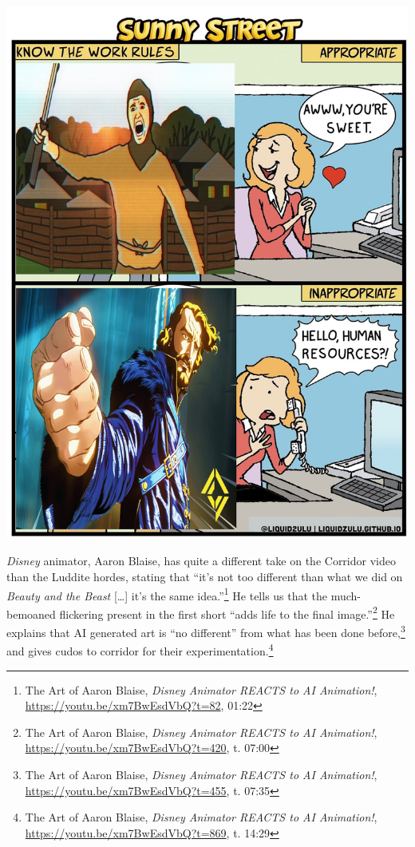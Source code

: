 \documentclass[11pt]{article}
\begin{document}
\begin{center}
\includegraphics[width=.9\linewidth]{./images/know the work rules corridor joel haver.jpg}
\end{center}

\emph{Disney} animator, Aaron Blaise, has quite a different take on the Corridor video than the Luddite hordes, stating that ``it's not too different than what we did on \emph{Beauty and the Beast} [\ldots{}] it's the same idea.''\footnote{The Art of Aaron Blaise, \emph{Disney Animator REACTS to AI Animation!}, \url{https://youtu.be/xm7BwEsdVbQ?t=82}, 01:22} He tells us that the much-bemoaned flickering present in the first short ``adds life to the final image.''\footnote{The Art of Aaron Blaise, \emph{Disney Animator REACTS to AI Animation!}, \url{https://youtu.be/xm7BwEsdVbQ?t=420}, t. 07:00} He explains that AI generated art is ``no different'' from what has been done before,\footnote{The Art of Aaron Blaise, \emph{Disney Animator REACTS to AI Animation!}, \url{https://youtu.be/xm7BwEsdVbQ?t=455}, t. 07:35} and gives cudos to corridor for their experimentation.\footnote{The Art of Aaron Blaise, \emph{Disney Animator REACTS to AI Animation!}, \url{https://youtu.be/xm7BwEsdVbQ?t=869}, t. 14:29}
\end{document}
